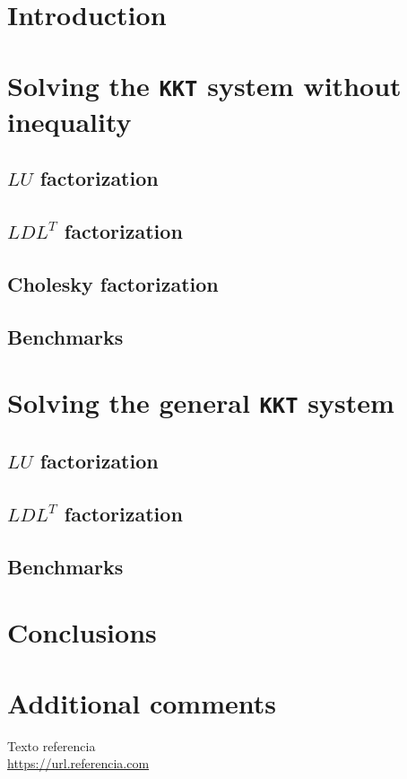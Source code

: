 \documentclass[11pt,a4paper]{article}
\begin{document}
\tableofcontents
\thispagestyle{empty}				%

\newpage

\setlength{\parskip}{1em}

\section{Introduction}

\section{Solving the \texttt{KKT} system without inequality}

\subsection{$LU$ factorization}

\subsection{$LDL^T$ factorization}

\subsection{Cholesky factorization}

\subsection{Benchmarks}

\section{Solving the general \texttt{KKT} system}

\subsection{$LU$ factorization}

\subsection{$LDL^T$ factorization}

\subsection{Benchmarks}

\section{Conclusions}

\section{Additional comments}

\newpage

\begin{thebibliography}{5}

Texto referencia
\\\url{https://url.referencia.com}

\end{thebibliography}
\end{document}
